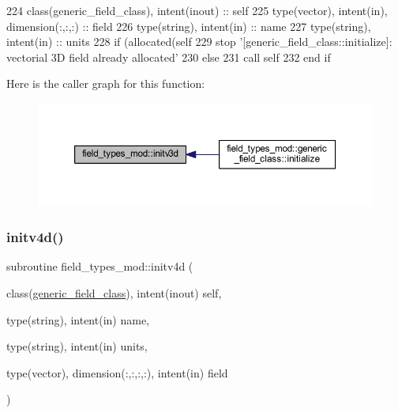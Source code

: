 \begin{DoxyCode}
224     \textcolor{keywordtype}{class}(generic\_field\_class), \textcolor{keywordtype}{intent(inout)} :: self
225     \textcolor{keywordtype}{type}(vector), \textcolor{keywordtype}{intent(in)}, \textcolor{keywordtype}{dimension(:,:,:)} :: field
226     \textcolor{keywordtype}{type}(string), \textcolor{keywordtype}{intent(in)} :: name
227     \textcolor{keywordtype}{type}(string), \textcolor{keywordtype}{intent(in)} :: units
228     \textcolor{keywordflow}{if} (\textcolor{keyword}{allocated}(self%
229         stop \textcolor{stringliteral}{'[generic\_field\_class::initialize]: vectorial 3D field already allocated'}
230     \textcolor{keywordflow}{else}
231         \textcolor{keyword}{call }self%
232 \textcolor{keywordflow}{    end if}
\end{DoxyCode}
Here is the caller graph for this function\+:
\nopagebreak
\begin{figure}[H]
\begin{center}
\leavevmode
\includegraphics[width=350pt]{namespacefield__types__mod_ae163912444021fda00f4d821d4c85721_icgraph}
\end{center}
\end{figure}
\mbox{\label{namespacefield__types__mod_a6a387f83b9c3e63a795e3bccfff5573b}} 
\subsubsection{\texorpdfstring{initv4d()}{initv4d()}}
{\footnotesize\ttfamily subroutine field\+\_\+types\+\_\+mod\+::initv4d (\begin{DoxyParamCaption}\item[{class(\mbox{\hyperlink{structfield__types__mod_1_1generic__field__class}{generic\+\_\+field\+\_\+class}}), intent(inout)}]{self,  }\item[{type(string), intent(in)}]{name,  }\item[{type(string), intent(in)}]{units,  }\item[{type(vector), dimension(\+:,\+:,\+:,\+:), intent(in)}]{field }\end{DoxyParamCaption})\hspace{0.3cm}{\ttfamily [private]}}



